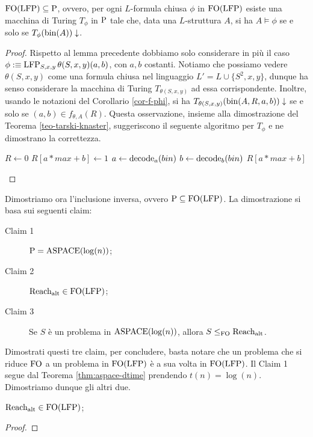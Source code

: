 \begin{proposizione}
\label{prop:FO(LFP)-subset-P}
 $\FO(\LFP) \subseteq \P$, ovvero, per ogni $L$-formula chiusa $\phi$ in $\FO(\LFP)$ esiste
 una macchina di Turing $T_\phi$ in $\P$ tale che, data una $L$-struttura $A$,
 si ha $A \models \phi$ se e solo se $T_\phi(\bin(A))\downarrow$.
\end{proposizione}
\begin{proof}
  Rispetto al lemma precedente dobbiamo solo considerare in più il caso
  $\phi :\equiv \LFP_{S,x,y}\theta(S,x,y)(a,b)$, con $a, b$ costanti.
  Notiamo che possiamo vedere
  $\theta(S,x,y)$ come una formula chiusa nel linguaggio $L'=L \cup \{S^2,x,y\}$,
  dunque ha senso considerare la macchina di Turing $T_{\theta(S,x,y)}$ ad essa
  corrispondente. Inoltre, usando le notazioni del Corollario \ref{cor-f-phi},
  si ha $T_{\theta(S,x,y)}(\bin(A,R,a,b))\downarrow$
  se e solo se $(a,b) \in f_{\theta,A}(R)$. Questa osservazione, insieme alla
  dimostrazione del Teorema \ref{teo-tarski-knaster}, suggeriscono il seguente
  algoritmo per $T_\phi$ e ne dimostrano la correttezza.
  
  \begin{algorithmic}
    \State $R\gets 0$
	\State $R[a*max + b] \gets 1$
      \EndIf
      \EndFor
    \EndFor
    \State $a \gets \decode_a (bin)$
    \State $b \gets \decode_b (bin)$
    \State \Return $R[a*max + b]$
  \EndFunction
  \end{algorithmic}
\end{proof}

Dimostriamo ora l'inclusione inversa, ovvero $\P \subseteq \FO(\LFP)$. La
dimostrazione si basa sui seguenti claim:
\begin{description}
 \item[Claim 1]\label{p_eq_a} $\P = \ASPACE(\log(n))$;
 \item[Claim 2]\label{ralt_in_p} $\Ralt \in \FO(\LFP)$;
 \item[Claim 3]\label{reduct_fo} Se $S$ è un problema in $\ASPACE(\log(n))$, allora $S \leq_{\FO} \Ralt$.
\end{description}
Dimostrati questi tre claim, per concludere, basta notare che un problema che si
riduce $\FO$ a un problema in $\FO(\LFP)$ è a sua volta in $\FO(\LFP)$.
Il Claim 1 segue dal Teorema \ref{thm:aspace-dtime} prendendo $t(n) = \log(n)$.
Dimostriamo dunque gli altri due.
\begin{proposizione}
\label{prop:ralt-in-fo(lfp)}
  $\Ralt \in \FO(\LFP)$;
\end{proposizione}
\begin{proof}
\end{proof}

